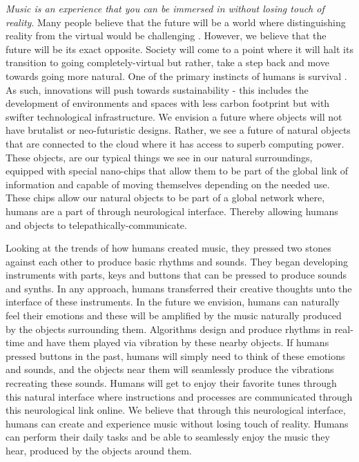 \documentclass[acmtog]{acmart}
\begin{document}
\textit{Music is an experience that you can be immersed in without losing touch of reality}. Many people believe that the future will be a world where distinguishing reality from the virtual would be challenging \cite{tamura2001mixed}. However, we believe that the future will be its exact opposite. Society will come to a point where it will halt its transition to going completely-virtual but rather, take a step back and move towards going more natural. One of the primary instincts of humans is survival \cite{khantzian1983self}. As such, innovations will push towards sustainability - this includes the development of environments and spaces with less carbon footprint but with swifter technological infrastructure. We envision a future where objects will not have brutalist or neo-futuristic designs. Rather, we see a future of natural objects that are connected to the cloud where it has access to superb computing power. These objects, are our typical things we see in our natural surroundings, equipped with special nano-chips that allow them to be part of the global link of information and capable of moving themselves depending on the needed use. These chips allow our natural objects to be part of a global network where, humans are a part of through neurological interface. Thereby allowing humans and objects to telepathically-communicate. 

Looking at the trends of how humans created music, they pressed two stones against each other to produce basic rhythms and sounds. They began developing instruments with parts, keys and buttons that can be pressed to produce sounds and synths. In any approach, humans transferred their creative thoughts unto the interface of these instruments. In the future we envision, humans can naturally feel their emotions and these will be amplified by the music naturally produced by the objects surrounding them. Algorithms design and produce rhythms in real-time and have them played via vibration by these nearby objects. If humans pressed buttons in the past, humans will simply need to think of these emotions and sounds, and the objects near them will seamlessly produce the vibrations recreating these sounds. Humans will get to enjoy their favorite tunes through this natural interface where instructions and processes are communicated through this neurological link online. We believe that through this neurological interface, humans can create and experience music without losing touch of reality. Humans can perform their daily tasks and be able to seamlessly enjoy the music they hear, produced by the objects around them. 
\end{document}
